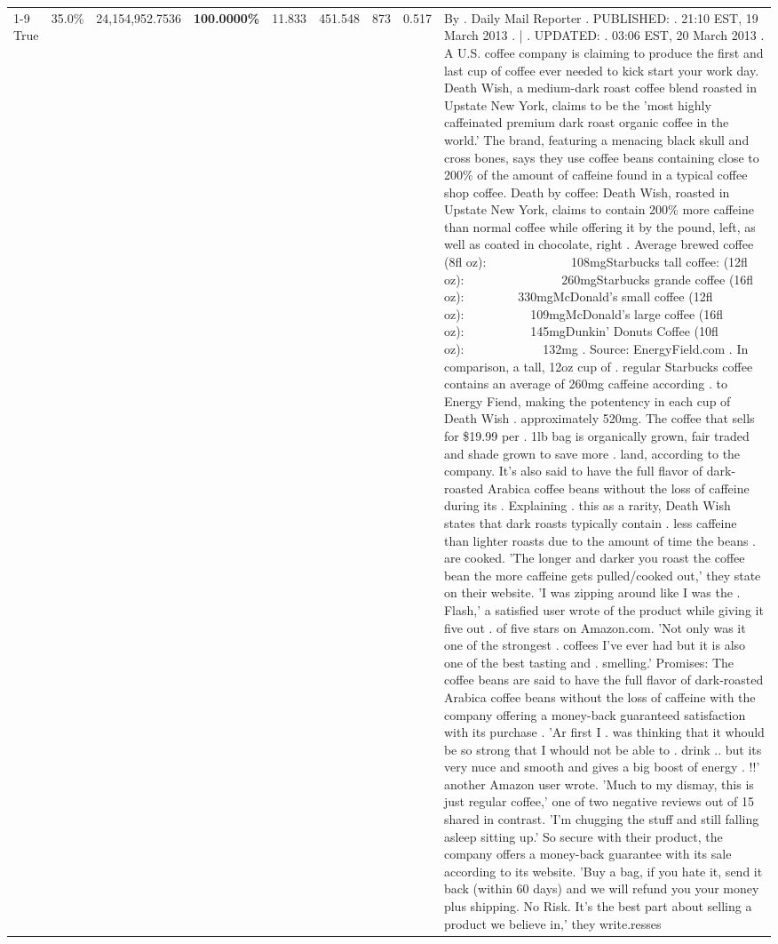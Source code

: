 \begin{table}[H]
{\begin{tabular}{lllrlllll}
\cline{1-9}
True & 35.0\% & 24,154,952.7536 & \bfseries \color{red} 100.0000\% & 11.833 & 451.548 & 873 & 0.517 & By . Daily Mail Reporter . PUBLISHED: . 21:10 EST, 19 March 2013 . | . UPDATED: . 03:06 EST, 20 March 2013 . A U.S. coffee company is claiming to produce the first and last cup of coffee ever needed to kick start your work day. Death Wish, a medium-dark roast coffee blend roasted in Upstate New York, claims to be the 'most highly caffeinated premium dark roast organic coffee in the world.' The brand, featuring a menacing black skull and cross bones, says they use coffee beans containing close to 200\% of the amount of caffeine found in a typical coffee shop coffee. Death by coffee: Death Wish, roasted in Upstate New York, claims to contain 200\% more caffeine than normal coffee while offering it by the pound, left, as well as coated in chocolate, right . Average brewed coffee (8fl oz):              108mgStarbucks tall coffee: (12fl oz):                260mgStarbucks grande coffee (16fl oz):         330mgMcDonald's small coffee (12fl oz):           109mgMcDonald's large coffee (16fl oz):           145mgDunkin' Donuts Coffee (10fl oz):             132mg . Source: EnergyField.com . In comparison, a tall, 12oz cup of . regular Starbucks coffee contains an average of 260mg caffeine according . to Energy Fiend, making the potentency in each cup of Death Wish . approximately 520mg. The coffee that sells for \$19.99 per . 1lb bag is organically grown, fair traded and shade grown to save more . land, according to the company. It's also said to have the full flavor of dark-roasted Arabica coffee beans without the loss of caffeine during its . Explaining . this as a rarity, Death Wish states that dark roasts typically contain . less caffeine than lighter roasts due to the amount of time the beans . are cooked. 'The longer and darker you roast the coffee bean the more caffeine gets pulled/cooked out,' they state on their website. 'I was zipping around like I was the . Flash,' a satisfied user wrote of the product while giving it five out . of five stars on Amazon.com. 'Not only was it one of the strongest . coffees I've ever had but it is also one of the best tasting and . smelling.’ Promises: The coffee beans are said to have the full flavor of dark-roasted Arabica coffee beans without the loss of caffeine with the company offering a money-back guaranteed satisfaction with its purchase . 'Ar first I . was thinking that it whould be so strong that I whould not be able to . drink .. but its very nuce and smooth and gives a big boost of energy . !!' another Amazon user wrote. 'Much to my dismay, this is just regular coffee,' one of two negative reviews out of 15 shared in contrast. 'I'm chugging the stuff and still falling asleep sitting up.' So secure with their product, the company offers a money-back guarantee with its sale according to its website. 'Buy a bag, if you hate it, send it back (within 60 days) and we will refund you your money plus shipping. No Risk. It’s the best part about selling a product we believe in,' they write.resses \\

\end{tabular}}
\end{table}
